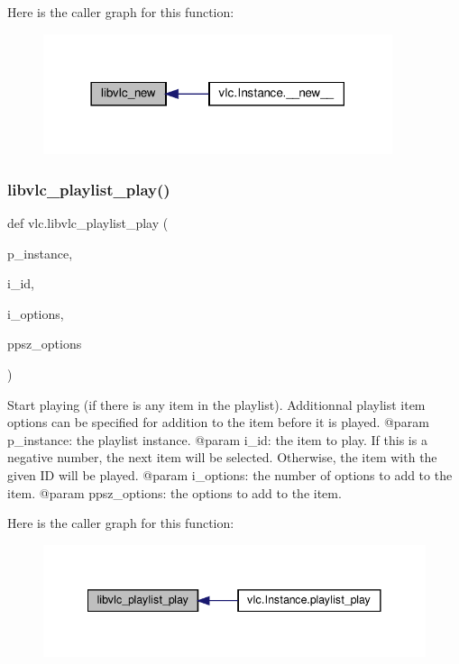 Here is the caller graph for this function\+:
\nopagebreak
\begin{figure}[H]
\begin{center}
\leavevmode
\includegraphics[width=290pt]{namespacevlc_a061db38b4ce8fdc316f730963401676c_icgraph}
\end{center}
\end{figure}
\mbox{\label{namespacevlc_ac8504e0fea6e5eb569fd5b008db60263}} 
\subsubsection{\texorpdfstring{libvlc\+\_\+playlist\+\_\+play()}{libvlc\_playlist\_play()}}
{\footnotesize\ttfamily def vlc.\+libvlc\+\_\+playlist\+\_\+play (\begin{DoxyParamCaption}\item[{}]{p\+\_\+instance,  }\item[{}]{i\+\_\+id,  }\item[{}]{i\+\_\+options,  }\item[{}]{ppsz\+\_\+options }\end{DoxyParamCaption})}

\begin{DoxyVerb}Start playing (if there is any item in the playlist).
Additionnal playlist item options can be specified for addition to the
item before it is played.
@param p_instance: the playlist instance.
@param i_id: the item to play. If this is a negative number, the next item will be selected. Otherwise, the item with the given ID will be played.
@param i_options: the number of options to add to the item.
@param ppsz_options: the options to add to the item.
\end{DoxyVerb}
 Here is the caller graph for this function\+:
\nopagebreak
\begin{figure}[H]
\begin{center}
\leavevmode
\includegraphics[width=341pt]{namespacevlc_ac8504e0fea6e5eb569fd5b008db60263_icgraph}
\end{center}
\end{figure}
\mbox{\label{namespacevlc_acb9159355d8b06728e1c00a49ae25309}} 
